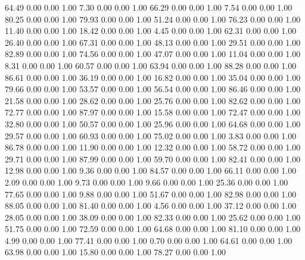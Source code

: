    64.49   0.00   0.00   1.00
    7.30   0.00   0.00   1.00
   66.29   0.00   0.00   1.00
    7.54   0.00   0.00   1.00
   80.25   0.00   0.00   1.00
   79.93   0.00   0.00   1.00
   51.24   0.00   0.00   1.00
   76.23   0.00   0.00   1.00
   11.40   0.00   0.00   1.00
   18.42   0.00   0.00   1.00
    4.45   0.00   0.00   1.00
   62.31   0.00   0.00   1.00
   26.40   0.00   0.00   1.00
   67.31   0.00   0.00   1.00
   48.13   0.00   0.00   1.00
   29.51   0.00   0.00   1.00
   82.89   0.00   0.00   1.00
   74.56   0.00   0.00   1.00
   47.07   0.00   0.00   1.00
   11.04   0.00   0.00   1.00
    8.31   0.00   0.00   1.00
   60.57   0.00   0.00   1.00
   63.94   0.00   0.00   1.00
   88.28   0.00   0.00   1.00
   86.61   0.00   0.00   1.00
   36.19   0.00   0.00   1.00
   16.82   0.00   0.00   1.00
   35.04   0.00   0.00   1.00
   79.66   0.00   0.00   1.00
   53.57   0.00   0.00   1.00
   56.54   0.00   0.00   1.00
   86.46   0.00   0.00   1.00
   21.58   0.00   0.00   1.00
   28.62   0.00   0.00   1.00
   25.76   0.00   0.00   1.00
   82.62   0.00   0.00   1.00
   72.77   0.00   0.00   1.00
   87.97   0.00   0.00   1.00
   15.58   0.00   0.00   1.00
   72.47   0.00   0.00   1.00
   32.80   0.00   0.00   1.00
   50.57   0.00   0.00   1.00
   25.96   0.00   0.00   1.00
   64.68   0.00   0.00   1.00
   29.57   0.00   0.00   1.00
   60.93   0.00   0.00   1.00
   75.02   0.00   0.00   1.00
    3.83   0.00   0.00   1.00
   86.78   0.00   0.00   1.00
   11.90   0.00   0.00   1.00
   12.32   0.00   0.00   1.00
   58.72   0.00   0.00   1.00
   29.71   0.00   0.00   1.00
   87.99   0.00   0.00   1.00
   59.70   0.00   0.00   1.00
   82.41   0.00   0.00   1.00
   12.98   0.00   0.00   1.00
    9.36   0.00   0.00   1.00
   84.57   0.00   0.00   1.00
   66.11   0.00   0.00   1.00
    2.09   0.00   0.00   1.00
    9.73   0.00   0.00   1.00
    9.66   0.00   0.00   1.00
   25.36   0.00   0.00   1.00
   77.65   0.00   0.00   1.00
    9.88   0.00   0.00   1.00
   51.67   0.00   0.00   1.00
   82.98   0.00   0.00   1.00
   88.05   0.00   0.00   1.00
   81.40   0.00   0.00   1.00
    4.56   0.00   0.00   1.00
   37.12   0.00   0.00   1.00
   28.05   0.00   0.00   1.00
   38.09   0.00   0.00   1.00
   82.33   0.00   0.00   1.00
   25.62   0.00   0.00   1.00
   51.75   0.00   0.00   1.00
   72.59   0.00   0.00   1.00
   64.68   0.00   0.00   1.00
   81.10   0.00   0.00   1.00
    4.99   0.00   0.00   1.00
   77.41   0.00   0.00   1.00
    0.70   0.00   0.00   1.00
   64.61   0.00   0.00   1.00
   63.98   0.00   0.00   1.00
   15.80   0.00   0.00   1.00
   78.27   0.00   0.00   1.00
